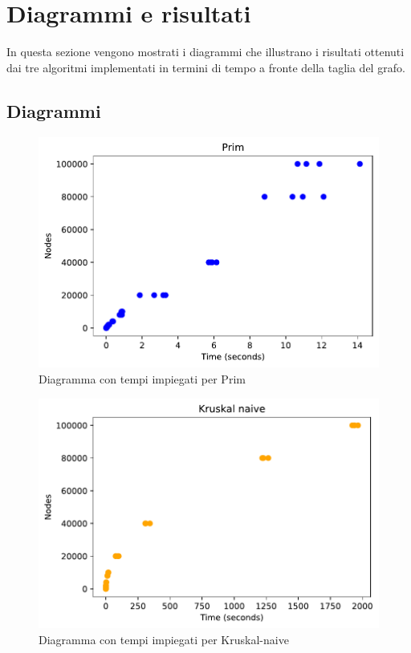 \chapter{Diagrammi e risultati\label{sec:risultati}}
\noindent In questa sezione vengono mostrati i diagrammi che illustrano i risultati ottenuti dai tre algoritmi implementati in termini di tempo a fronte della taglia del grafo.

\section{Diagrammi\label{sec:diagrammi}}

\begin{figure}[htp]
    \centering
    \includegraphics[width=\textwidth]{immagini/prim.pdf}
    \caption{Diagramma con tempi impiegati per Prim}
    \label{fig:diagramma-prim}
\end{figure}

\begin{figure}[htp]
    \centering
    \includegraphics[width=\textwidth]{immagini/naive.pdf}
    \caption{Diagramma con tempi impiegati per Kruskal-naive}
    \label{fig:diagramma-naive}
\end{figure}

